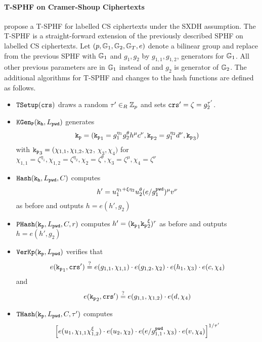 \paragraph{\ac{T-SPHF} on Cramer-Shoup Ciphertexts}
\citet{Benhamouda2013} propose a \ac{T-SPHF} for labelled \ac{CS} ciphertexts under the \ac{SXDH} assumption.
The \ac{T-SPHF} is a straight-forward extension of the previously described \ac{SPHF} on labelled \ac{CS} ciphertexts.
Let $(p, \mathbb{G}_1, \mathbb{G}_2, \mathbb{G}_T, e)$ denote a bilinear group and replace \GG from the previous \ac{SPHF} with $\mathbb{G}_1$ and $g_1,g_2$ by $g_{1,1},g_{1,2}$, generators for $\mathbb{G}_1$.
All other previous parameters are in $\mathbb{G}_1$ instead of \GG and $g_2$ is generator of $\mathbb{G}_2$.
The additional algorithms for \ac{T-SPHF} and changes to the hash functions are defined as follows.
\begin{itemize}
  \item $\mathtt{TSetup}(\mathtt{crs})$ draws a random $\tau'\in_R\mathbb{Z}_p$ and sets $\mathtt{crs}'=\zeta=g_2^{\tau'}$.
  \item $\mathtt{KGen_P}(\mathtt{k_h}, L_\mathtt{pwd})$ generates 
      \[\mathtt{k_p}=(\mathtt{k_p}_1=g_1^{\eta_1} g_2^{\theta} h^\mu c^\nu, \mathtt{k_p}_2=g_1^{\eta_2} d^{\nu}, \mathtt{k_p}_3)\] with 
      $\mathtt{k_p}_3=(\chi_{1,1}, \chi_{1,2}, \chi_2$, $\chi_3, \chi_4)$ for 
      $\chi_{1,1}={\zeta}^{\eta_1}, \chi_{1,2}={\zeta}^{\eta_2}, \chi_2={\zeta}^{\theta}, \chi_3={\zeta}^{\mu}, \chi_4={\zeta}^{\nu}$
  \item $\mathtt{Hash}(\mathtt{k_h}, L_\mathtt{pwd}, C)$ computes 
      \[h'=u_1^{\eta_1+\xi\eta_2} u_2^{\theta} (e/g_1^{\mathtt{pwd}})^\mu v^\nu\] 
      as before and outputs $h=e(h',g_2)$
  \item $\mathtt{PHash}(\mathtt{k_p}, L_\mathtt{pwd}, C, r)$ computes $h'=(\mathtt{k_p}_1 \mathtt{k_p}_2^\xi)^r$ as before and outputs $h=e(h',g_2)$
  \item $\mathtt{VerKp}(\mathtt{k_p}, L_\mathtt{pwd})$ verifies that 
      \[e(\mathtt{k_p}_1, \mathtt{crs}')\stackrel{?}{=} e(g_{1,1}, \chi_{1,1})\cdot e(g_{1,2}, \chi_2)\cdot e(h_1, \chi_3)\cdot e(c, \chi_4)\] and
      \[e(\mathtt{k_p}_2, \mathtt{crs}') \stackrel{?}{=} e(g_{1,1}, \chi_{1,2})\cdot e(d, \chi_4)\]
  \item $\mathtt{THash}(\mathtt{k_p}, L_\mathtt{pwd}, C, \tau')$ computes 
  \[\left[ e(u_1, \chi_{1,1} \chi_{1,2}^{\xi})\cdot e(u_2, \chi_2)\cdot e(e/g_{1,1}^{\mathtt{pwd}}, \chi_3)\cdot e(v, \chi_4) \right]^{1/\tau'}\]
\end{itemize}
